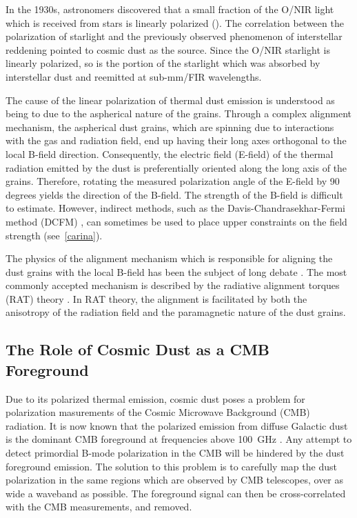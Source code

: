 In the 1930s, astronomers discovered that a small fraction of the O/NIR light which is received from stars is linearly polarized (\citet{hall1949observations,hiltner1949polarization}). The correlation between the polarization of starlight and the previously observed phenomenon of interstellar reddening pointed to cosmic dust as the source. Since the O/NIR starlight is linearly polarized, so is the portion of the starlight which was absorbed by interstellar dust and reemitted at sub-mm/FIR wavelengths.

The cause of the linear polarization of thermal dust emission is understood as being to due to the aspherical nature of the grains. Through a complex alignment mechanism, the aspherical dust grains, which are spinning due to interactions with the gas and radiation field, end up having their long axes orthogonal to the local B-field direction. Consequently, the electric field (E-field) of the thermal radiation emitted by the dust is preferentially oriented along the long axis of the grains. Therefore, rotating the measured polarization angle of the E-field by 90 degrees yields the direction of the B-field. The strength of the B-field is difficult to estimate. However, indirect methods, such as the Davis-Chandrasekhar-Fermi method (DCFM) \citep{chandrasekhar1953magnetic}, can sometimes be used to place upper constraints on the field strength (see~\ref{carina}).

The physics of the alignment mechanism which is responsible for aligning the dust grains with the local B-field has been the subject of long debate \citep{andersson2015interstellar}. The most commonly accepted mechanism is described by the radiative alignment torques (RAT) theory \citep{lazarian2007radiative}. In RAT theory, the alignment is facilitated by both the anisotropy of the radiation field and the paramagnetic nature of the dust grains.

\subsection{The Role of Cosmic Dust as a CMB Foreground}

Due to its polarized thermal emission, cosmic dust poses a problem for polarization masurements of the Cosmic Microwave Background (CMB) radiation. It is now known that the polarized emission from diffuse Galactic dust is the dominant CMB foreground at frequencies above 100~GHz \citep{adam2016planck}. Any attempt to detect primordial B-mode polarization in the CMB will be hindered by the dust foreground emission. The solution to this problem is to carefully map the dust polarization in the same regions which are observed by CMB telescopes, over as wide a waveband as possible. The foreground signal can then be cross-correlated with the CMB measurements, and removed.

